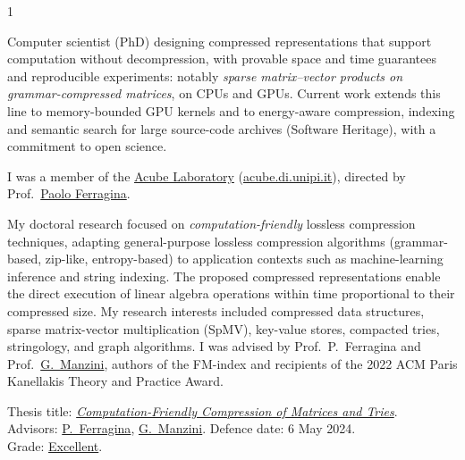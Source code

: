 \documentclass[10pt,a4paper,ragged2e,academicons]{altacv}
\begin{document}
\makecvheader



\begin{paracol}{1}

\medskip
\noindent
Computer scientist (PhD) designing compressed representations that support computation without decompression, with provable space and time guarantees and reproducible experiments: notably {\em sparse matrix--vector products on grammar-compressed matrices}, on CPUs and GPUs. Current work extends this line to memory-bounded GPU kernels and to energy-aware compression, indexing and semantic search for large source-code archives (Software Heritage), with a commitment to open science.

\medskip



I was a member of the \href{https://acube.di.unipi.it}{Acube Laboratory} (\href{https://acube.di.unipi.it}{acube.di.unipi.it}), directed by Prof.~\href{https://pages.di.unipi.it/ferragina/}{Paolo Ferragina}.

My doctoral research focused on {\em computation-friendly} lossless compression techniques, adapting general-purpose lossless compression algorithms (grammar-based, zip-like, entropy-based) to application contexts such as machine-learning inference and string indexing. The proposed compressed representations enable the direct execution of linear algebra operations within time proportional to their compressed size. My research interests included compressed data structures, sparse matrix-vector multiplication (SpMV), key-value stores, compacted tries, stringology, and graph algorithms. I was advised by Prof.~P.~Ferragina and Prof.~\href{https://pages.di.unipi.it/manzini/}{G.~Manzini}, authors of the FM-index and recipients of the 2022 ACM Paris Kanellakis Theory and Practice Award.

\smallskip

{\sc Thesis title:} \textit{\href{https://etd.adm.unipi.it/t/etd-04182024-175520}{Computation-Friendly Compression of Matrices and Tries}}. \\Advisors: \href{https://www.santannapisa.it/en/paolo-ferragina}{P.~Ferragina}, \href{https://pages.di.unipi.it/manzini/}{G.~Manzini}. Defence date: 6 May 2024.\\Grade: \href{https://www.francescotosoni.it/static/phd.pdf}{Excellent}.


\end{paracol}
\end{document}
